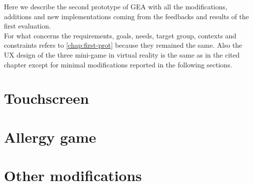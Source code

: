 Here we describe the second prototype of GEA with all the modifications, additions and new implementations coming from the feedbacks and results of the first evaluation.\\
For what concerns the requirements, goals, needs, target group, contexts and constraints refers to \autoref{chap:first-prot} because they remained the same. Also the UX design of the three mini-game in virtual reality is the same as in the cited chapter except for minimal modifications reported in the following sections.
\section{Touchscreen}
\section{Allergy game}
\section{Other modifications}